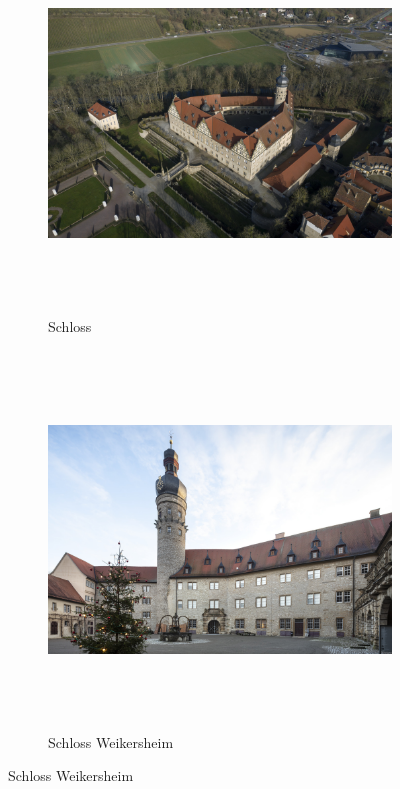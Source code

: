 \documentclass[
  a4paper,
]{book}
\begin{document}
\begin{figure}
\clearpage

\begin{figure}[H]    
  \includegraphics[height=10cm]{images/fmd10024322a.jpg}
  \caption{Schloss}
  \label{fig:{images/fmd10024322a.jpg}}
\end{figure}

\clearpage

\begin{figure}[H]    
  \includegraphics[height=10cm]{images/fmd10005902a.jpg}
  \caption{Schloss Weikersheim}
  \label{fig:{images/fmd10005902a.jpg}}
\end{figure}

\clearpage


\end{figure}
\end{document}
